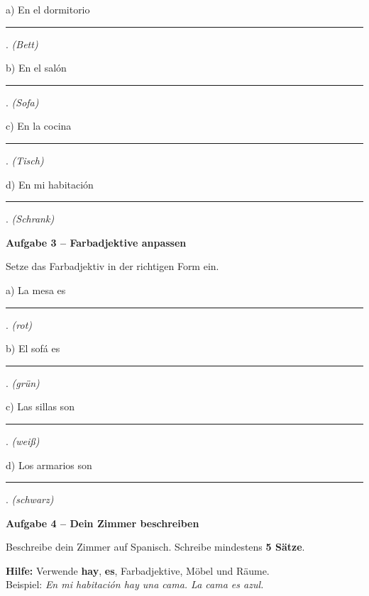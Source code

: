 \documentclass[11pt, a4paper]{article}
\newcommand{\fachfarbe}{spanisch}
\newcommand{\punktebox}[1]{\hfill\fbox{\small \_/#1}}
\newcommand{\luecke}[1]{\rule{#1}{0.4pt}}
\newenvironment{aufgabe}[1]{%
    \needspace{5\baselineskip}%
    \nopagebreak[4]%
    \vspace{10pt}
    \noindent\textbf{\textcolor{\fachfarbe}{Aufgabe #1}}
    \nopagebreak[4]%
    \vspace{5pt}
    \nopagebreak[4]%
    \begin{list}{}{\leftmargin=0pt}
    \item[]
}{%
    \end{list}
}
\newcommand{\es}[1]{\textcolor{\fachfarbe}{\textbf{#1}}}
\begin{document}
\noindent
a) En el dormitorio \luecke{5cm}. \hfill \textit{(Bett)}

\vspace{0.8em}

\noindent
b) En el salón \luecke{5cm}. \hfill \textit{(Sofa)}

\vspace{0.8em}

\noindent
c) En la cocina \luecke{5cm}. \hfill \textit{(Tisch)}

\vspace{0.8em}

\noindent
d) En mi habitación \luecke{5cm}. \hfill \textit{(Schrank)}

\vspace{15pt}


\begin{aufgabe}{3 -- Farbadjektive anpassen}
Setze das Farbadjektiv in der richtigen Form ein. \punktebox{8}
\end{aufgabe}

\noindent
a) La mesa es \luecke{3cm}. \hfill \textit{(rot)}

\vspace{0.8em}

\noindent
b) El sofá es \luecke{3cm}. \hfill \textit{(grün)}

\vspace{0.8em}

\noindent
c) Las sillas son \luecke{3cm}. \hfill \textit{(weiß)}

\vspace{0.8em}

\noindent
d) Los armarios son \luecke{3cm}. \hfill \textit{(schwarz)}

\vspace{15pt}


\begin{aufgabe}{4 -- Dein Zimmer beschreiben}
Beschreibe dein Zimmer auf Spanisch. Schreibe mindestens \textbf{5 Sätze}. \punktebox{10}
\end{aufgabe}

\begin{hintbox}
\textbf{Hilfe:} Verwende \es{hay}, \es{es}, Farbadjektive, Möbel und Räume. \\
Beispiel: \textit{En mi habitación hay una cama. La cama es azul.}
\end{hintbox}
\end{document}
